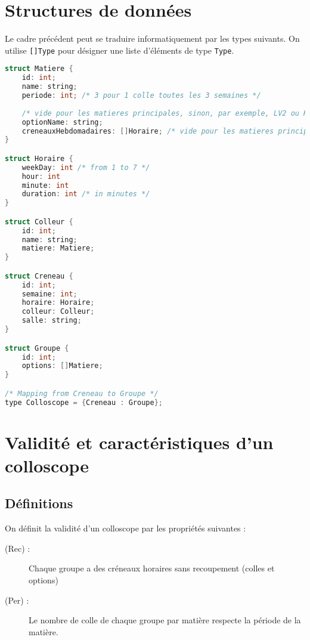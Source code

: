 \documentclass{article}
\begin{document}
\clearpage


\section{Structures de données} \label{types}

Le cadre précédent peut se traduire informatiquement par les types suivants. On utilise \texttt{[]Type} pour désigner une liste d'éléments de type \texttt{Type}.

\begin{lstlisting}[language=C]
struct Matiere {
    id: int;
    name: string;
    periode: int; /* 3 pour 1 colle toutes les 3 semaines */
    
    /* vide pour les matieres principales, sinon, par exemple, LV2 ou HorE */
    optionName: string; 
    creneauxHebdomadaires: []Horaire; /* vide pour les matieres principales */
}

struct Horaire {
    weekDay: int /* from 1 to 7 */
    hour: int 
    minute: int 
    duration: int /* in minutes */
}

struct Colleur {
    id: int;
    name: string;
    matiere: Matiere;
}

struct Creneau {
    id: int;
    semaine: int;
    horaire: Horaire;
    colleur: Colleur;
    salle: string;
}

struct Groupe {
    id: int;
    options: []Matiere; 
}

/* Mapping from Creneau to Groupe */
type Colloscope = {Creneau : Groupe};

\end{lstlisting}

\section{Validité et caractéristiques d'un colloscope}

\subsection{Définitions}

On définit la validité d'un colloscope par les propriétés suivantes :
\begin{description}
    \item[(Rec) :] Chaque groupe a des créneaux horaires sans recoupement (colles et options)
    \item[(Per) :] Le nombre de colle de chaque groupe par matière respecte la période de la matière.
\end{description}
\end{document}
